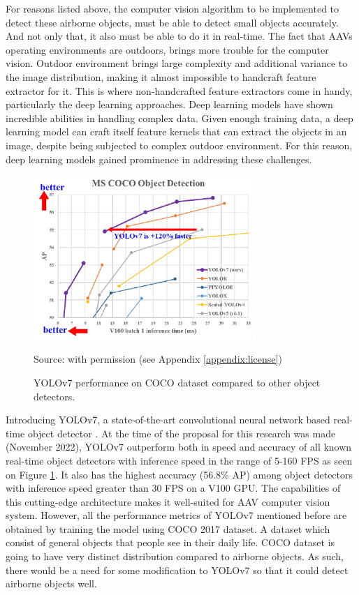     For reasons listed above, the computer vision algorithm to be implemented to detect these airborne objects, 
    must be able to detect small objects accurately. And not only that, it also must be able to do it in real-time.
    The fact that AAVs operating environments are outdoors, brings more trouble for the computer
    vision. Outdoor environment brings large complexity and additional variance to the image distribution, 
    making it almost impossible to handcraft feature extractor for it. This is where non-handcrafted
    feature extractors come in handy, particularly the deep learning approaches. Deep learning models
    have shown incredible abilities in handling complex data. Given enough training data, a deep learning
    model can craft itself feature kernels that can extract the objects in an image, despite being subjected
    to complex outdoor environment. For this reason, deep learning models gained prominence in addressing
    these challenges. 
    
    \begin{figure}[t]
        \centering
        \includegraphics[width=0.75\textwidth]{figures/yolov7-coco.png}
        \caption*{Source: \textcite{yolov7} with permission (see Appendix \ref{appendix:license})}
        \caption{YOLOv7 performance on COCO dataset compared to other object detectors.}
        \label{fig:yolov7-coco}

    \end{figure}

    Introducing YOLOv7, a state-of-the-art convolutional neural network based real-time object detector \parencite{yolov7}.
    At the time of the proposal for this research was made (November 2022),
    YOLOv7 outperform both in speed and accuracy of all known real-time object detectors 
    with inference speed in the range of 5-160 FPS as seen on Figure \ref{fig:yolov7-coco}. It also has the highest accuracy (56.8\% AP) among
    object detectors with inference speed greater than 30 FPS on a V100 GPU. The capabilities of this cutting-edge architecture
    makes it well-suited for AAV computer vision system. However, all the performance metrics of YOLOv7
    mentioned before are obtained by training the model using COCO 2017 dataset. A dataset which 
    consist of general objects that people see in their daily life. COCO dataset is going to have
    very distinct distribution compared to airborne objects. As such, there would be a need for
    some modification to YOLOv7 so that it could detect airborne objects well.

